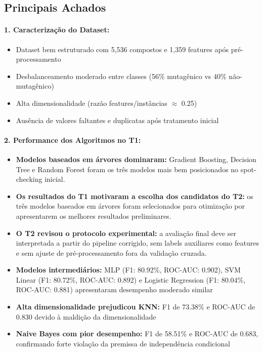 \documentclass[12pt,a4paper]{article}
\begin{document}
\subsection{Principais Achados}

\paragraph{1. Caracterização do Dataset:}

\begin{itemize}
    \item Dataset bem estruturado com 5,536 compostos e 1,359 features após pré-processamento
    \item Desbalanceamento moderado entre classes (56\% mutagênico vs 40\% não-mutagênico)
    \item Alta dimensionalidade (razão features/instâncias $\approx$ 0.25)
    \item Ausência de valores faltantes e duplicatas após tratamento inicial
\end{itemize}

\paragraph{2. Performance dos Algoritmos no T1:}

\begin{itemize}
    \item \textbf{Modelos baseados em árvores dominaram:} Gradient Boosting, Decision Tree e Random Forest foram os três modelos mais bem posicionados no spot-checking inicial.
    
    \item \textbf{Os resultados do T1 motivaram a escolha dos candidatos do T2:} os três modelos baseados em árvores foram selecionados para otimização por apresentarem os melhores resultados preliminares.
    
    \item \textbf{O T2 revisou o protocolo experimental:} a avaliação final deve ser interpretada a partir do pipeline corrigido, sem labels auxiliares como features e sem ajuste de pré-processamento fora da validação cruzada.
    
    \item \textbf{Modelos intermediários:} MLP (F1: 80.92\%, ROC-AUC: 0.902), SVM Linear (F1: 80.72\%, ROC-AUC: 0.892) e Logistic Regression (F1: 80.04\%, ROC-AUC: 0.881) apresentaram desempenho moderado similar
    
    \item \textbf{Alta dimensionalidade prejudicou KNN:} F1 de 73.38\% e ROC-AUC de 0.830 devido à maldição da dimensionalidade
    
    \item \textbf{Naive Bayes com pior desempenho:} F1 de 58.51\% e ROC-AUC de 0.683, confirmando forte violação da premissa de independência condicional
\end{itemize}
\end{document}
